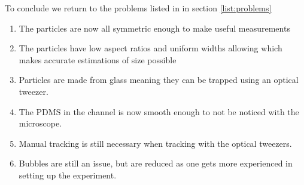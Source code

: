 To conclude we return to the problems listed in in section \ref{list:problems} 

\begin{enumerate} \label{list:solutions}
	\item The particles are now all symmetric enough to make useful measurements
	\item The particles have low aspect ratios and uniform widths allowing which makes accurate estimations of size possible
	\item Particles are made from glass meaning they can be trapped using an optical tweezer.
	\item The PDMS in the channel is now smooth enough to not be noticed with the microscope.
	\item Manual tracking is still necessary when tracking with the optical tweezers.
	\item Bubbles are still an issue, but are reduced as one gets more experienced in setting up the experiment.
\end{enumerate}
